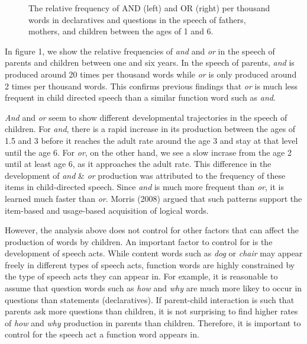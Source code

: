 \documentclass[10pt, letterpaper]{article}
\newenvironment{CodeChunk}{}{}
\begin{document}
\begin{CodeChunk}
\begin{figure}[t]
{}

\caption[The relative frequency of AND (left) and OR (right) per thousand words in declaratives and questions in the speech of fathers, mothers, and children between the ages of 1 and 6]{The relative frequency of AND (left) and OR (right) per thousand words in declaratives and questions in the speech of fathers, mothers, and children between the ages of 1 and 6.}\label{fig:byspeechActPlots}
\end{figure}
\end{CodeChunk}

In figure 1, we show the relative frequencies of \emph{and} and
\emph{or} in the speech of parents and children between one and six
years. In the speech of parents, \emph{and} is produced around 20 times
per thousand words while \emph{or} is only produced around 2 times per
thousand words. This confirms previous findings that \emph{or} is much
less frequent in child directed speech than a similar function word such
as \emph{and}.

\emph{And} and \emph{or} seem to show different developmental
trajectories in the speech of children. For \emph{and}, there is a rapid
increase in its production between the ages of 1.5 and 3 before it
reaches the adult rate around the age 3 and stay at that level until the
age 6. For \emph{or}, on the other hand, we see a slow incrase from the
age 2 until at least age 6, as it approaches the adult rate. This
difference in the development of \emph{and} \& \emph{or} production was
attributed to the frequency of these items in child-directed speech.
Since \emph{and} is much more frequent than \emph{or}, it is learned
much faster than \emph{or}. Morris (2008) argued that such patterns
support the item-based and usage-based acquisition of logical words.

However, the analysis above does not control for other factors that can
affect the production of words by children. An important factor to
control for is the development of speech acts. While content words such
as \emph{dog} or \emph{chair} may appear freely in different types of
speech acts, function words are highly constrained by the type of speech
acts they can appear in. For example, it is reasonable to assume that
question words such as \emph{how} and \emph{why} are much more likey to
occur in questions than statements (declaratives). If parent-child
interaction is such that parents ask more questions than children, it is
not surprising to find higher rates of \emph{how} and \emph{why}
production in parents than children. Therefore, it is important to
control for the speech act a function word appears in.
\end{document}
